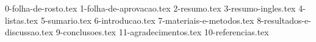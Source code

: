 \documentclass[12pt,nodisplayskipstretch]{article}
\begin{document}
{0-folha-de-rosto.tex}
{1-folha-de-aprovacao.tex}
{2-resumo.tex}
{3-resumo-ingles.tex}
{4-listas.tex}
{5-sumario.tex}
{6-introducao.tex}
{7-materiais-e-metodos.tex}
{8-resultados-e-discussao.tex}
{9-conclusoes.tex}
{11-agradecimentos.tex}
{10-referencias.tex}
\end{document}
